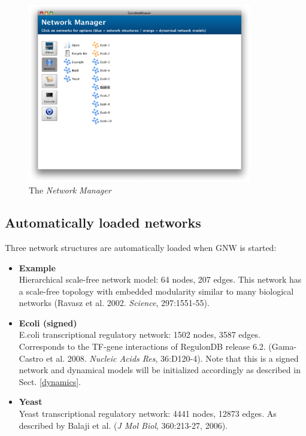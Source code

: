 \documentclass{llncs}
\newenvironment{mylist}{
\begin{itemize}
}{\end{itemize}}
\begin{document}
\begin{figure}[tbh]
\centering\includegraphics[width=9.8cm]{figures/network-manager}
\caption{The \emph{Network Manager}}
\label{network-manager}
\end{figure}


\subsection{Automatically loaded networks}
\label{loaded-networks}

Three network structures are automatically loaded when GNW is started:
\begin{mylist}
 \item \textbf{Example}\\
 Hierarchical scale-free network model: 64 nodes, 207 edges. This network has a scale-free topology with embedded modularity similar to many biological networks (Ravasz et al. 2002. \emph{Science}, 297:1551-55).\\
 \item \textbf{Ecoli (signed)}\\
 E.coli transcriptional regulatory network: 1502 nodes, 3587 edges. Corresponds to the TF-gene interactions of RegulonDB release 6.2. (Gama-Castro et al. 2008. \emph{Nucleic Acids Res}, 36:D120-4). Note that this is a signed network and dynamical models will be initialized accordingly as described in Sect. \ref{dynamics}.\\
 \item \textbf{Yeast}\\
 Yeast transcriptional regulatory network: 4441 nodes, 12873 edges. As described by Balaji et al. (\emph{J Mol Biol}, 360:213-27, 2006).
\end{mylist}


\end{document}
